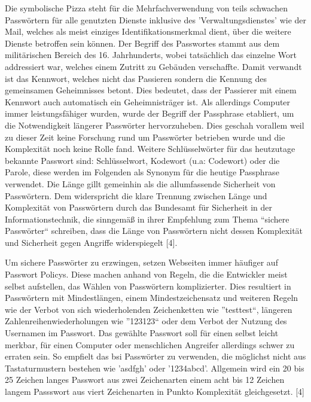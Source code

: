 Die symbolische Pizza steht für die Mehrfachverwendung von teils schwachen Passwörtern für alle genutzten Dienste inklusive des 'Verwaltungsdienstes' wie der Mail, welches als meist einziges Identifikationsmerkmal dient, über die weitere Dienste betroffen sein können. Der Begriff des Passwortes stammt aus dem militärischen Bereich des 16. Jahrhunderts, wobei tatsächlich das einzelne Wort addressiert war, welches einem Zutritt zu Gebäuden verschaffte. Damit verwandt ist das Kennwort, welches nicht das Passieren sondern die Kennung des gemeinsamen Geheimnisses betont. Dies bedeutet, dass der Passierer mit einem Kennwort auch automatisch ein Geheimnisträger ist. Als allerdings Computer immer leistungsfähiger wurden, wurde der Begriff der Passphrase etabliert, um die Notwendigkeit längerer Passwörter hervorzuheben. Dies geschah vorallem weil zu dieser Zeit keine Forschung rund um Passwörter betrieben wurde und die Komplexität noch keine Rolle fand. Weitere Schlüsselwörter für das heutzutage bekannte Passwort sind: Schlüsselwort, Kodewort (u.a: Codewort) oder die Parole, diese werden im Folgenden als Synonym für die heutige Passphrase verwendet. Die Länge gillt gemeinhin als die allumfassende Sicherheit von Passwörtern. Dem widerspricht die klare Trennung zwischen Länge und Komplexität von Passwörtern durch das Bundesamt für Sicherheit in der Informationstechnik, die sinngemäß in ihrer Empfehlung zum Thema ``sichere Passwörter`` schreiben, dass die Länge von Passwörtern nicht dessen Komplexität und Sicherheit gegen Angriffe widerspiegelt [4].

Um sichere Passwörter zu erzwingen, setzen Webseiten immer häufiger auf Passwort Policys. Diese machen anhand von Regeln, die die Entwickler meist selbst aufstellen, das Wählen von Passwörtern komplizierter. Dies resultiert in Passwörtern mit Mindestlängen, einem Mindestzeichensatz und weiteren Regeln wie der Verbot von sich wiederholenden Zeichenketten wie ''testtest``, längeren Zahlenreihenwiederholungen wie ''123123`` oder dem Verbot der Nutzung des Usernamen im Passwort. Das gewählte Passwort soll für einen selbst leicht merkbar, für einen Computer oder menschlichen Angreifer allerdings schwer zu erraten sein. So empfielt das \ac{bsi} Passwörter zu verwenden, die möglichst nicht aus Tastaturmustern bestehen wie 'asdfgh' oder '1234abcd'. Allgemein wird ein 20 bis 25 Zeichen langes Passwort aus zwei Zeichenarten einem acht bis 12 Zeichen langem Passswort aus viert Zeichenarten in Punkto Komplexität gleichgesetzt. [4]

